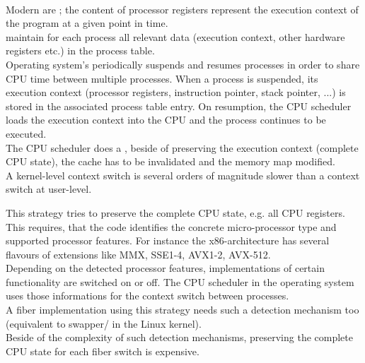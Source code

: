 \label{implementations}

\xspace\\

Modern  are ; the content of
processor registers represent the execution context of the program at a given
point in time.\\
 maintain for each process all relevant data (execution
context, other hardware registers etc.) in the process table.\\
Operating system's  periodically suspends and resumes
processes in order to share CPU time between multiple processes. When a process
is suspended, its execution context (processor registers, instruction pointer,
stack pointer, ...) is stored in the associated process table entry. On
resumption, the CPU scheduler loads the execution context into the CPU and the
process continues to be executed.\\
The CPU scheduler does a , beside of preserving
the execution context (complete CPU state), the cache has to be invalidated and
the memory map modified.\\
A kernel-level context switch is several orders of magnitude slower than a
context switch at user-level\cite{Tanenbaum2009}.

 This strategy tries to
preserve the complete CPU state, e.g. all CPU registers. This requires, that the
code identifies the concrete micro-processor type and supported processor
features. For instance the x86-architecture has several flavours of extensions
like MMX, SSE1-4, AVX1-2, AVX-512.\\
Depending on the detected processor features, implementations of certain
functionality are switched on or off. The CPU scheduler in the operating system
uses those informations for the context switch  between processes.\\
A fiber implementation using this strategy needs such a detection mechanism
too (equivalent to swapper/ in the Linux kernel).\\
Beside of the complexity of such detection mechanisms, preserving the complete
CPU state for each fiber switch is expensive.


